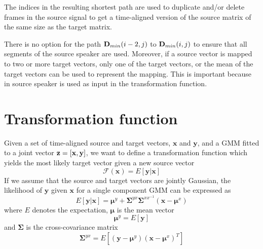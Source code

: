 The indices in the resulting shortest path are used to duplicate and/or delete frames in the source signal to get a time-aligned version of the source matrix of the same size as the target matrix.


\begin{remark}
There is no option for the path $\textbf{D}_{min}(i-2,j)$ to $\textbf{D}_{min}(i,j)$ to ensure that all segments of the source speaker are used. Moreover, if a source vector is mapped to two or more target vectors, only one of the target vectors, or the mean of the target vectors can be used to represent the mapping. This is important because in source speaker is used as input in the transformation function.
\end{remark}



\section{Transformation function} %
\label{sec:transformation_function}
Given a set of time-aligned source and target vectors, $\mathbf{x}$ and $\mathbf{y}$, and a GMM fitted to a joint vector $\mathbf{z}=\left[\mathbf{x},\mathbf{y}\right]$, we want to define a transformation function which yields the most likely target vector given a new source vector
\newcommand{\fff}{\mathcal F}
\begin{equation}
	\fff(\mathbf{x}) = E[\mathbf{y}\vert \mathbf{x}]
\end{equation}
If we assume that the source and target vectors are jointly Gaussian, the likelihood of $\mathbf{y}$ given $\mathbf{x}$ for a single component GMM can be expressed as \cite{kay93}
\begin{equation}
	E[\mathbf{y}\vert \mathbf{x}] = \boldsymbol{\mu}^y + \mathbf{\Sigma}^{yx} \mathbf{\Sigma}^{xx^{-1}} (\mathbf{x}-\boldsymbol{\mu}^x)
\end{equation}
where $E$ denotes the expectation, $\boldsymbol{\mu}$ is the mean vector
\begin{equation}
	\boldsymbol{\mu}^y = E[\mathbf{y}]
\end{equation}
and $\mathbf{\Sigma}$ is the cross-covariance matrix
\begin{equation}
	\mathbf{\Sigma}^{yx} = E[(\mathbf{y}-\boldsymbol{\mu}^y)(\mathbf{x}-\boldsymbol{\mu}^x)^T]
\end{equation}

